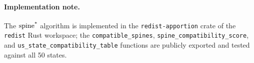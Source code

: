 \paragraph{Implementation note.}  The $\operatorname{spine^*}$ algorithm is implemented in the
\texttt{redist-apportion} crate of the \texttt{redist} Rust workspace; the
\texttt{compatible\_spines}, \texttt{spine\_compatibility\_score}, and
\texttt{us\_state\_compatibility\_table} functions are publicly exported and
tested against all 50 states.
